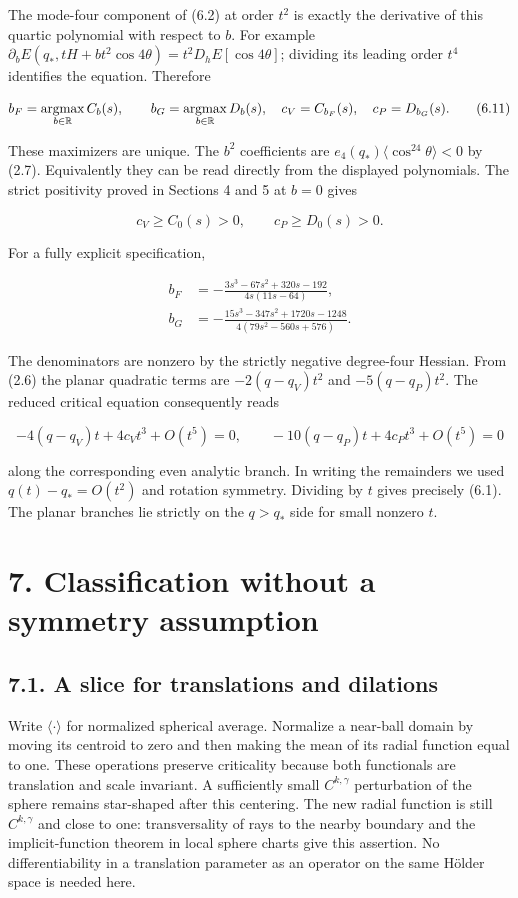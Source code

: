 \documentclass[11pt]{article}
\begin{document}
The mode-four component of (6.2) at order \(t^2\) is exactly the
derivative of this quartic polynomial with respect to \(b\). For example
\(\partial_b E(q_*,tH+bt^2\cos4\theta)=t^2D_hE[\cos4\theta]\); dividing
its leading order \(t^4\) identifies the equation. Therefore

\[
b_F=\mathop{\rm argmax}_{b\in\mathbb R}C_b(s),\qquad
b_G=\mathop{\rm argmax}_{b\in\mathbb R}D_b(s),
\quad c_V=C_{b_F}(s),\quad c_P=D_{b_G}(s).
\tag{6.11}
\]

These maximizers are unique. The \(b^2\) coefficients are
\(e_4(q_*)\langle\cos^24\theta\rangle<0\) by (2.7). Equivalently they
can be read directly from the displayed polynomials. The strict
positivity proved in Sections 4 and 5 at \(b=0\) gives

\[
c_V\ge C_0(s)>0,\qquad c_P\ge D_0(s)>0.
\tag{6.12}
\]

For a fully explicit specification,

\[
\begin{aligned}
b_F&=-\frac{3s^3-67s^2+320s-192}{4s(11s-64)},\\
b_G&=-\frac{15s^3-347s^2+1720s-1248}{4(79s^2-560s+576)}.
\end{aligned}
\tag{6.13}
\]

The denominators are nonzero by the strictly negative degree-four
Hessian. From (2.6) the planar quadratic terms are \(-2(q-q_V)t^2\) and
\(-5(q-q_P)t^2\). The reduced critical equation consequently reads

\[
-4(q-q_V)t+4c_Vt^3+O(t^5)=0,
\qquad
-10(q-q_P)t+4c_Pt^3+O(t^5)=0
\tag{6.14}
\]

along the corresponding even analytic branch. In writing the remainders
we used \(q(t)-q_*=O(t^2)\) and rotation symmetry. Dividing by \(t\)
gives precisely (6.1). The planar branches lie strictly on the \(q>q_*\)
side for small nonzero \(t\).

\section{7. Classification without a symmetry
assumption}\label{classification-without-a-symmetry-assumption}

\subsection{7.1. A slice for translations and
dilations}\label{a-slice-for-translations-and-dilations}

Write \(\langle\cdot\rangle\) for normalized spherical average.
Normalize a near-ball domain by moving its centroid to zero and then
making the mean of its radial function equal to one. These operations
preserve criticality because both functionals are translation and scale
invariant. A sufficiently small \(C^{k,\gamma}\) perturbation of the
sphere remains star-shaped after this centering. The new radial function
is still \(C^{k,\gamma}\) and close to one: transversality of rays to
the nearby boundary and the implicit-function theorem in local sphere
charts give this assertion. No differentiability in a translation
parameter as an operator on the same Hölder space is needed here.
\end{document}
